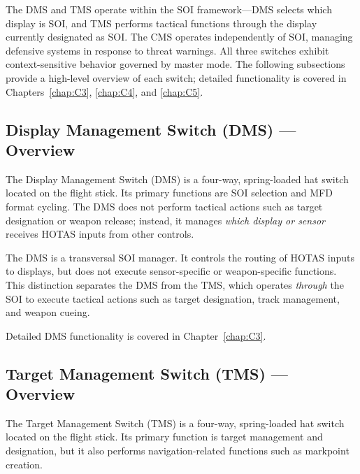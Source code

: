 \documentclass[11pt, a4paper, twoside]{report}
\begin{document}
The DMS and TMS operate within the SOI framework—DMS selects which display is SOI, and TMS performs tactical functions through the display currently designated as SOI. The CMS operates independently of SOI, managing defensive systems in response to threat warnings. All three switches exhibit context-sensitive behavior governed by master mode. The following subsections provide a high-level overview of each switch; detailed functionality is covered in Chapters~\ref{chap:C3}, \ref{chap:C4}, and \ref{chap:C5}.


\subsection{Display Management Switch (DMS) — Overview}
\label{sec:C2-S3-S1}

The Display Management Switch (DMS) is a four-way, spring-loaded hat switch located on the flight stick. Its primary functions are SOI selection and MFD format cycling. The DMS does not perform tactical actions such as target designation or weapon release; instead, it manages \textit{which display or sensor} receives HOTAS inputs from other controls.

The DMS is a transversal SOI manager. It controls the routing of HOTAS inputs to displays, but does not execute sensor-specific or weapon-specific functions. This distinction separates the DMS from the TMS, which operates \textit{through} the SOI to execute tactical actions such as target designation, track management, and weapon cueing.

Detailed DMS functionality is covered in Chapter~\ref{chap:C3}.


\subsection{Target Management Switch (TMS) — Overview}
\label{sec:C2-S3-S2}

The Target Management Switch (TMS) is a four-way, spring-loaded hat switch located on the flight stick. Its primary function is target management and designation, but it also performs navigation-related functions such as markpoint creation.
\end{document}
